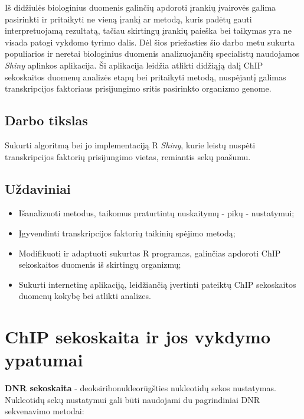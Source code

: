 \documentclass[12pt]{article}
\begin{document}
Iš didžiulės biologinius duomenis galinčių apdoroti įrankių įvairovės galima
pasirinkti ir pritaikyti ne vieną įrankį ar metodą, kuris padėtų gauti
interpretuojamą rezultatą, tačiau skirtingų įrankių paieška bei taikymas yra ne
visada patogi vykdomo tyrimo dalis. Dėl šios priežasties šio darbo metu
sukurta populiarios ir neretai biologinius duomenis analizuojančių specialistų
naudojamos \emph{Shiny} aplinkos aplikacija. Ši aplikacija leidžia atlikti
didžiąją dalį ChIP sekoskaitos duomenų analizės etapų bei pritaikyti metodą,
nuspėjantį galimas transkripcijos faktoriaus prisijungimo sritis pasirinkto 
organizmo genome.

\subsection*{Darbo tikslas}
Sukurti algoritmą bei jo implementaciją R \emph{Shiny}, kurie leistų nuspėti
transkripcijos faktorių prisijungimo vietas, remiantis sekų paašumu.

\subsection*{Uždaviniai}
\begin{itemize}
    \item Išanalizuoti metodus, taikomus praturtintų nuskaitymų - pikų -
          nustatymui;
    \item Įgyvendinti transkripcijos faktorių taikinių spėjimo metodą;
    \item Modifikuoti ir adaptuoti sukurtas R programas, galinčias apdoroti
          ChIP sekoskaitos duomenis iš skirtingų organizmų;          
    \item Sukurti internetinę aplikaciją, leidžiančią įvertinti pateiktų
          ChIP sekoskaitos duomenų kokybę bei atlikti analizes.

\end{itemize}

\newpage


\section{ChIP sekoskaita ir jos vykdymo ypatumai}

\textbf{DNR sekoskaita} - deoksiribonukleorūgšties nukleotidų sekos nustatymas.
Nukleotidų sekų nustatymui gali būti naudojami du pagrindiniai DNR sekvenavimo 
metodai:
\end{document}
